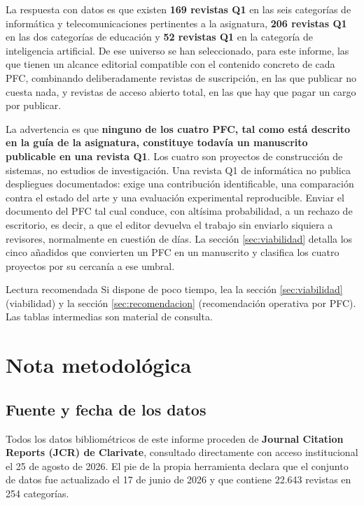 \documentclass[11pt,a4paper]{article}
\begin{document}
La respuesta con datos es que existen \textbf{169 revistas Q1} en las seis categorías de informática y telecomunicaciones pertinentes a la asignatura, \textbf{206 revistas Q1} en las dos categorías de educación y \textbf{52 revistas Q1} en la categoría de inteligencia artificial. De ese universo se han seleccionado, para este informe, las que tienen un alcance editorial compatible con el contenido concreto de cada PFC, combinando deliberadamente revistas de suscripción, en las que publicar no cuesta nada, y revistas de acceso abierto total, en las que hay que pagar un cargo por publicar.

La advertencia es que \textbf{ninguno de los cuatro PFC, tal como está descrito en la guía de la asignatura, constituye todavía un manuscrito publicable en una revista Q1}. Los cuatro son proyectos de construcción de sistemas, no estudios de investigación. Una revista Q1 de informática no publica despliegues documentados: exige una contribución identificable, una comparación contra el estado del arte y una evaluación experimental reproducible. Enviar el documento del PFC tal cual conduce, con altísima probabilidad, a un rechazo de escritorio, es decir, a que el editor devuelva el trabajo sin enviarlo siquiera a revisores, normalmente en cuestión de días. La sección \ref{sec:viabilidad} detalla los cinco añadidos que convierten un PFC en un manuscrito y clasifica los cuatro proyectos por su cercanía a ese umbral.

\begin{aviso}{Lectura recomendada}
	Si dispone de poco tiempo, lea la sección \ref{sec:viabilidad} (viabilidad) y la sección \ref{sec:recomendacion} (recomendación operativa por PFC). Las tablas intermedias son material de consulta.
\end{aviso}

\section{Nota metodológica}

\subsection{Fuente y fecha de los datos}

Todos los datos bibliométricos de este informe proceden de \textbf{Journal Citation Reports (JCR) de Clarivate}, consultado directamente con acceso institucional el 25 de agosto de 2026. El pie de la propia herramienta declara que el conjunto de datos fue actualizado el 17 de junio de 2026 y que contiene 22.643 revistas en 254 categorías.
\end{document}
